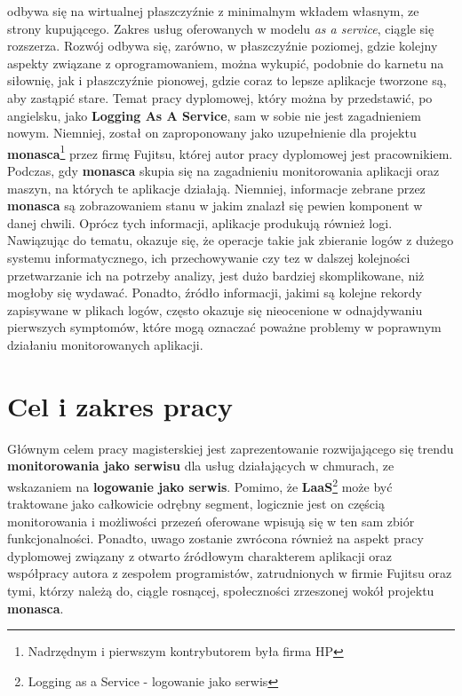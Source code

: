 odbywa się na wirtualnej płaszczyźnie z minimalnym wkładem własnym, ze strony kupującego. Zakres usług oferowanych w modelu \textit{as a service}, ciągle
się rozszerza. Rozwój odbywa się, zarówno, w płaszczyźnie poziomej, gdzie kolejny aspekty związane z oprogramowaniem, można wykupić, podobnie do karnetu 
na siłownię, jak i płaszczyźnie pionowej, gdzie coraz to lepsze aplikacje tworzone są, aby zastąpić stare. 
Temat pracy dyplomowej, który można by przedstawić, po angielsku, jako \textbf{Logging As A Service}, sam w sobie nie jest zagadnieniem
nowym. Niemniej, został on zaproponowany jako uzupełnienie dla projektu \textbf{monasca}\footnote{Nadrzędnym i pierwszym kontrybutorem była firma HP} przez
firmę Fujitsu, której autor pracy dyplomowej jest pracownikiem. 
Podczas, gdy \textbf{monasca} skupia się na zagadnieniu monitorowania aplikacji oraz maszyn, na których te aplikacje działają. Niemniej, informacje
zebrane przez \textbf{monasca} są zobrazowaniem stanu w jakim znalazł się pewien komponent w danej chwili. Oprócz tych informacji, aplikacje produkują
również logi. Nawiązując do tematu, okazuje się, że operacje takie jak zbieranie logów z dużego systemu informatycznego, ich przechowywanie
czy tez w dalszej kolejności przetwarzanie ich na potrzeby analizy, jest dużo bardziej skomplikowane, niż mogłoby się wydawać. 
Ponadto, źródło informacji, jakimi są kolejne rekordy zapisywane w plikach logów, często okazuje się nieocenione w odnajdywaniu
pierwszych symptomów, które mogą oznaczać poważne problemy w poprawnym działaniu monitorowanych aplikacji.


\section{Cel i zakres pracy}

Głównym celem pracy magisterskiej jest zaprezentowanie rozwijającego się trendu \textbf{monitorowania jako serwisu} dla usług działających w chmurach,
ze wskazaniem na \textbf{logowanie jako serwis}. Pomimo, że \textbf{LaaS}\footnote{Logging as a Service - logowanie jako serwis} 
może być traktowane jako całkowicie odrębny segment, logicznie jest on częścią monitorowania i możliwości przezeń oferowane wpisują się w ten sam
zbiór funkcjonalności. 
Ponadto, uwago zostanie zwrócona również na aspekt pracy dyplomowej związany z otwarto źródłowym charakterem aplikacji oraz
współpracy autora z zespołem programistów, zatrudnionych w firmie Fujitsu oraz tymi, którzy należą do, ciągle rosnącej, społeczności zrzeszonej wokół projektu \textbf{monasca}. 

